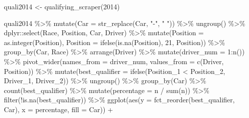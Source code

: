 \documentclass[
]{book}
\newenvironment{Shaded}{\begin{snugshade}}{\end{snugshade}}
\newcommand{\AttributeTok}[1]{\textcolor[rgb]{0.77,0.63,0.00}{#1}}
\newcommand{\DecValTok}[1]{\textcolor[rgb]{0.00,0.00,0.81}{#1}}
\newcommand{\FunctionTok}[1]{\textcolor[rgb]{0.00,0.00,0.00}{#1}}
\newcommand{\NormalTok}[1]{#1}
\newcommand{\OtherTok}[1]{\textcolor[rgb]{0.56,0.35,0.01}{#1}}
\newcommand{\SpecialCharTok}[1]{\textcolor[rgb]{0.00,0.00,0.00}{#1}}
\newcommand{\StringTok}[1]{\textcolor[rgb]{0.31,0.60,0.02}{#1}}
\begin{document}
\begin{Shaded}
\begin{Highlighting}[]
\NormalTok{quali2014 }\OtherTok{\textless{}{-}} \FunctionTok{qualifying\_scraper}\NormalTok{(}\DecValTok{2014}\NormalTok{)}

\NormalTok{quali2014 }\SpecialCharTok{\%\textgreater{}\%}
  \FunctionTok{mutate}\NormalTok{(}\AttributeTok{Car =} \FunctionTok{str\_replace}\NormalTok{(Car, }\StringTok{"{-}"}\NormalTok{, }\StringTok{" "}\NormalTok{)) }\SpecialCharTok{\%\textgreater{}\%} 
  \FunctionTok{ungroup}\NormalTok{() }\SpecialCharTok{\%\textgreater{}\%}
\NormalTok{  dplyr}\SpecialCharTok{::}\FunctionTok{select}\NormalTok{(Race, Position, Car, Driver) }\SpecialCharTok{\%\textgreater{}\%}
  \FunctionTok{mutate}\NormalTok{(}\AttributeTok{Position =} \FunctionTok{as.integer}\NormalTok{(Position),}
         \AttributeTok{Position =} \FunctionTok{ifelse}\NormalTok{(}\FunctionTok{is.na}\NormalTok{(Position), }\DecValTok{21}\NormalTok{, Position)) }\SpecialCharTok{\%\textgreater{}\%} 
  \FunctionTok{group\_by}\NormalTok{(Car, Race) }\SpecialCharTok{\%\textgreater{}\%} 
  \FunctionTok{arrange}\NormalTok{(Driver) }\SpecialCharTok{\%\textgreater{}\%} 
  \FunctionTok{mutate}\NormalTok{(}\AttributeTok{driver\_num =} \DecValTok{1}\SpecialCharTok{:}\FunctionTok{n}\NormalTok{()) }\SpecialCharTok{\%\textgreater{}\%} 
  \FunctionTok{pivot\_wider}\NormalTok{(}\AttributeTok{names\_from =} \StringTok{\textquotesingle{}driver\_num\textquotesingle{}}\NormalTok{, }\AttributeTok{values\_from =} \FunctionTok{c}\NormalTok{(}\StringTok{\textquotesingle{}Driver\textquotesingle{}}\NormalTok{, }\StringTok{\textquotesingle{}Position\textquotesingle{}}\NormalTok{)) }\SpecialCharTok{\%\textgreater{}\%}
  \FunctionTok{mutate}\NormalTok{(}\AttributeTok{best\_qualifier =} \FunctionTok{ifelse}\NormalTok{(Position\_1 }\SpecialCharTok{\textless{}}\NormalTok{ Position\_2, Driver\_1, Driver\_2)) }\SpecialCharTok{\%\textgreater{}\%}
  \FunctionTok{ungroup}\NormalTok{() }\SpecialCharTok{\%\textgreater{}\%}
  \FunctionTok{group\_by}\NormalTok{(Car) }\SpecialCharTok{\%\textgreater{}\%}
  \FunctionTok{count}\NormalTok{(best\_qualifier) }\SpecialCharTok{\%\textgreater{}\%}
  \FunctionTok{mutate}\NormalTok{(}\AttributeTok{percentage =}\NormalTok{ n }\SpecialCharTok{/} \FunctionTok{sum}\NormalTok{(n)) }\SpecialCharTok{\%\textgreater{}\%}
  \FunctionTok{filter}\NormalTok{(}\SpecialCharTok{!}\FunctionTok{is.na}\NormalTok{(best\_qualifier)) }\SpecialCharTok{\%\textgreater{}\%}
  \FunctionTok{ggplot}\NormalTok{(}\FunctionTok{aes}\NormalTok{(}\AttributeTok{y =} \FunctionTok{fct\_reorder}\NormalTok{(best\_qualifier, Car), }\AttributeTok{x =}\NormalTok{ percentage, }\AttributeTok{fill =}\NormalTok{ Car)) }\SpecialCharTok{+}

\end{Highlighting}
\end{Shaded}
\end{document}
